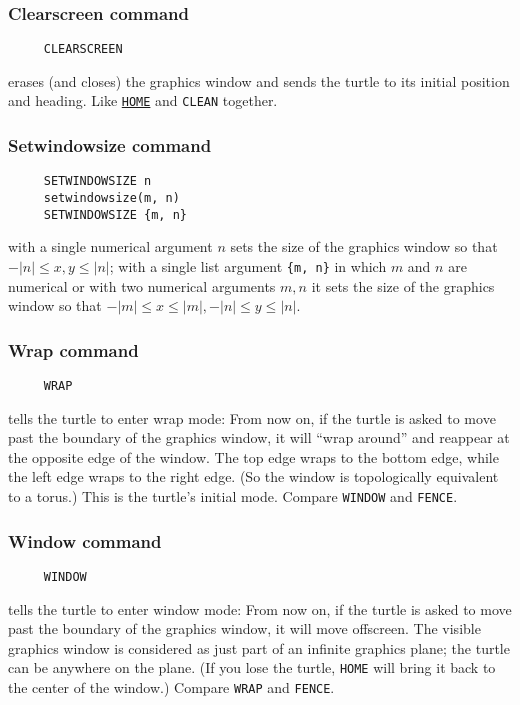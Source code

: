 \subsubsection*{Clearscreen command}
\begin{verbatim}
     CLEARSCREEN
\end{verbatim}
erases (and closes) the graphics window and sends the turtle to its
initial position and heading.  Like
\texttt{\hyperref[logoturtle:home]{HOME}} and \texttt{CLEAN}
together.

\subsubsection*{Setwindowsize command}
\begin{verbatim}
     SETWINDOWSIZE n
     setwindowsize(m, n)
     SETWINDOWSIZE {m, n}
\end{verbatim}
with a single numerical argument $n$ sets the size of the graphics
window so that $-|n| \le x,y \le |n|$; with a single list argument
\texttt{\{m, n\}} in which $m$ and $n$ are numerical or with two
numerical arguments $m, n$ it sets the size of the graphics window so
that $-|m| \le x \le |m|, -|n| \le y \le |n|$.

\subsubsection*{Wrap command}
\begin{verbatim}
     WRAP
\end{verbatim}
tells the turtle to enter wrap mode: From now on, if the turtle is
asked to move past the boundary of the graphics window, it will ``wrap
around'' and reappear at the opposite edge of the window.  The top
edge wraps to the bottom edge, while the left edge wraps to the right
edge.  (So the window is topologically equivalent to a torus.)  This
is the turtle's initial mode.  Compare \texttt{WINDOW} and
\texttt{FENCE}.

\subsubsection*{Window command}
\begin{verbatim}
     WINDOW
\end{verbatim}
tells the turtle to enter window mode: From now on, if the turtle is
asked to move past the boundary of the graphics window, it will move
offscreen.  The visible graphics window is considered as just part of
an infinite graphics plane; the turtle can be anywhere on the plane.
(If you lose the turtle, \texttt{HOME} will bring it back to the
center of the window.)  Compare \texttt{WRAP} and \texttt{FENCE}.

